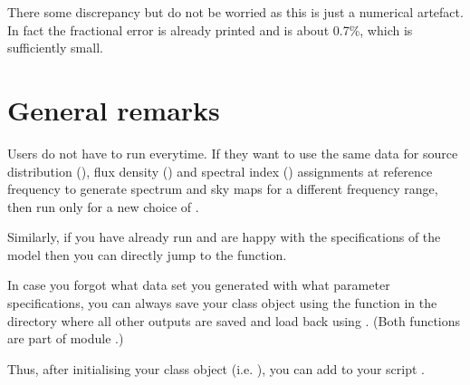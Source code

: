 \documentclass[letterpaper,10pt,english]{sphinxmanual}
\begin{document}
\sphinxAtStartPar
There some discrepancy but do not be worried as this is just a numerical artefact. In fact the fractional error is already printed and is about 0.7\%, which is sufficiently small.

\sphinxstepscope


\chapter{General remarks}
\label{\detokenize{genrem:general-remarks}}\label{\detokenize{genrem::doc}}
\sphinxAtStartPar
Users do not have to run  everytime. If they want to use the same data for source distribution (), flux density () and spectral index () assignments at reference frequency to generate spectrum and sky maps for a different frequency range, then run only  for a new choice of .

\sphinxAtStartPar
Similarly, if you have already run  and are happy with the specifications of the model then you can directly jump to the  function.

\sphinxAtStartPar
In case you forgot what data set you generated with what parameter specifications, you can always save your class object using the function  in the directory where all other outputs are saved and load back using . (Both functions are part of module .)

\sphinxAtStartPar
Thus, after initialising your class object (i.e. ), you can add to your script .

\sphinxAtStartPar
{}

\begin{sphinxVerbatim}[commandchars=\\\{\}]
   

  
\end{sphinxVerbatim}
\end{document}
